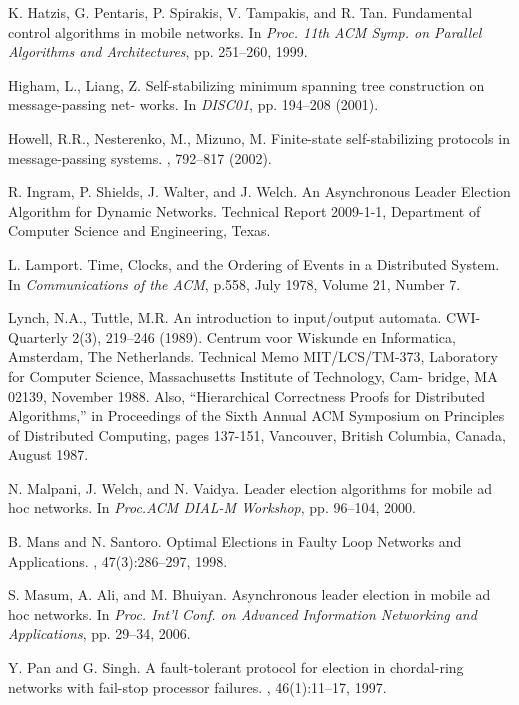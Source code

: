 \begin{thebibliography}{1}
	K. Hatzis, G. Pentaris, P. Spirakis, V. Tampakis, and R. Tan.
	\newblock  Fundamental control algorithms in mobile networks.
	\newblock In {\em Proc. 11th ACM Symp. on Parallel Algorithms and Architectures}, pp. 251–260, 1999.
	
	Higham, L., Liang, Z.
	\newblock  Self-stabilizing minimum spanning tree construction on message-passing net- works.
	\newblock In {\em DISC01}, pp. 194–208 (2001).
	
	Howell, R.R., Nesterenko, M., Mizuno, M.
	\newblock Finite-state self-stabilizing protocols in message-passing systems.
	, 792–817 (2002).
	
	R. Ingram, P. Shields, J. Walter, and J. Welch.
	\newblock An Asynchronous Leader Election Algorithm for Dynamic Networks. Technical Report 2009-1-1, Department of Computer Science and Engineering, Texas.
	
	L. Lamport.
	\newblock  Time, Clocks, and the Ordering of Events in a Distributed System.
	\newblock In {\em Communications of the ACM}, p.558, July 1978, Volume 21, Number 7.
	
	Lynch, N.A., Tuttle, M.R.
	\newblock An introduction to input/output automata. CWI-Quarterly 2(3), 219–246 (1989). Centrum voor Wiskunde en Informatica, Amsterdam, The Netherlands. Technical Memo MIT/LCS/TM-373, Laboratory for Computer Science, Massachusetts Institute of Technology, Cam- bridge, MA 02139, November 1988. Also, “Hierarchical Correctness Proofs for Distributed Algorithms,” in Proceedings of the Sixth Annual ACM Symposium on Principles of Distributed Computing, pages 137-151, Vancouver, British Columbia, Canada, August 1987.
	
	N. Malpani, J. Welch, and N. Vaidya.
	\newblock  Leader election algorithms for mobile ad hoc networks.
	\newblock In {\em Proc.ACM DIAL-M Workshop}, pp. 96–104, 2000.
	
	B. Mans and N. Santoro.
	\newblock  Optimal Elections in Faulty Loop Networks and Applications.
	, 47(3):286–297, 1998.
	
	S. Masum, A. Ali, and M. Bhuiyan.
	\newblock  Asynchronous leader election in mobile ad hoc networks.
	\newblock In {\em Proc. Int’l Conf. on Advanced Information Networking and Applications}, pp. 29–34, 2006.
	
	Y. Pan and G. Singh.
	\newblock A fault-tolerant protocol for election in chordal-ring networks with fail-stop processor failures.
	, 46(1):11–17, 1997.
	

\end{thebibliography}
